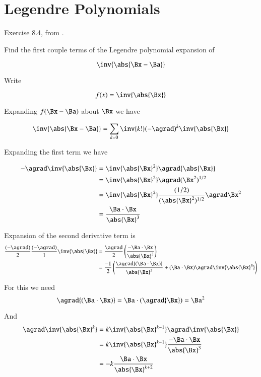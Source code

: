 \chapter{Legendre Polynomials} 
\label{chap:legendre}
\date{ Feb 4, 2008.  $RCSfile: legendre.tex,v $ Last $Revision: 1.8 $ $Date: 2009/06/14 17:59:59 $ }

Exercise 8.4, from \cite{hestenes1999nfc}.

Find the first couple terms of the Legendre polynomial expansion of 

\[
\inv{\abs{\Bx - \Ba}}
\]

Write

\[
f(x) = \inv{\abs{\Bx}}
\]

Expanding $f(\Bx - \Ba)$ about $\Bx$ we have

\[
\inv{\abs{\Bx - \Ba}} = 
\sum_{k=0}{ \inv{k!} (-\agrad)^k} \inv{\abs{\Bx}}
\]

Expanding the first term we have

\begin{align*}
-\agrad \inv{\abs{\Bx}} 
&= 
\inv{{\abs{\Bx}}^2} \agrad {\abs{\Bx}} \\
&= 
\inv{{\abs{\Bx}}^2} \agrad (\Bx^2)^{1/2} \\
&= 
\inv{{\abs{\Bx}}^2} \frac{(1/2)}{({\abs{\Bx}}^2)^{1/2}}\agrad \Bx^2 \\
&= 
\frac{\Ba \cdot \Bx}{{\abs{\Bx}}^3} 
\end{align*}

Expansion of the second derivative term is
\begin{align*}
\frac{(-\agrad)}{2}\frac{(-\agrad)}{1}\inv{\abs{\Bx}} 
&= 
\frac{\agrad}{2} \left(\frac{-\Ba \cdot \Bx}{{\abs{\Bx}}^3}\right) \\
&= 
\frac{-1}{2}
\left( 
\frac{\agrad {(\Ba \cdot \Bx)}}{{\abs{\Bx}}^3} + {(\Ba \cdot \Bx)}\agrad \inv{{\abs{\Bx}}^3} \right) \\
\end{align*}

For this we need 
\[
\agrad {(\Ba \cdot \Bx)} = 
\Ba \cdot (\agrad {\Bx}) = \Ba^2
\]

And 
\begin{align*}
\agrad \inv{{\abs{\Bx}}^k}
&=
k \inv{{\abs{\Bx}}^{k-1}} \agrad \inv{{\abs{\Bx}}} \\
&=
k \inv{{\abs{\Bx}}^{k-1}} \frac{- \Ba \cdot \Bx }{{\abs{\Bx}}^3} \\
&=
-k \frac{\Ba \cdot \Bx }{{\abs{\Bx}}^{k+2}} \\
\end{align*}

